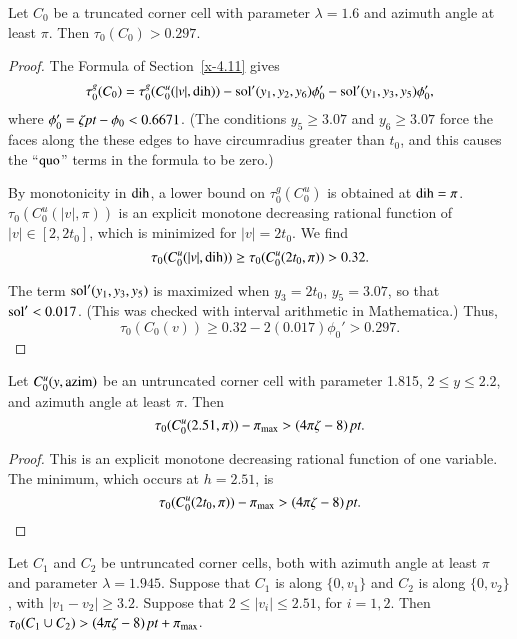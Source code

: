 \begin{lemma}\label{lemma:tcc-est} 
 Let $C_0$ be a truncated corner cell with
parameter $\lambda=1.6$ and azimuth angle at least $\pi$. 
Then $\tau_0(C_0) > 0.297$.
\end{lemma}




\begin{proof}
 The Formula of Section~\ref{x-4.11}
gives
    $$
    \tau_0^g(C_0) =
    \tau^g_0(C^u_0(|v|,\operatorname{dih}))
    - \operatorname{sol}'(y_1,y_2,y_6) \phi'_0
    -\operatorname{sol}'(y_1,y_3,y_5)\phi'_0,
    $$
where $\phi'_0 = \zeta\hbox{\it pt}-\phi_0 < 0.6671$. (The conditions $y_5\ge3.07$
and $y_6\ge 3.07$ force the faces along the these edges to have
circumradius greater than $t_0$, and this causes the ``$\operatorname{quo}$'' terms in
the formula to be zero.)

By monotonicity in $\operatorname{dih}$, a lower bound on $\tau^g_0(C^u_0)$ is
obtained at $\operatorname{dih}=\pi$. $\tau_0(C^u_0(|v|,\pi))$ is an explicit monotone
decreasing rational function of $|v|\in[2,2t_0]$, which is minimized for
$|v|=2t_0$.  We find
    $$\tau_0(C_0^u(|v|,\operatorname{dih}))\ge\tau_0(C_0^u(2t_0,\pi)) >0.32.$$

The term $\operatorname{sol}'(y_1,y_3,y_5)$ is maximized when $y_3=2t_0$, $y_5=3.07$,
so that $\operatorname{sol}'< 0.017$.  (This was checked with interval arithmetic in
Mathematica.) Thus,
    $$\tau_0(C_0(v))\ge 0.32 - 2(0.017) \phi_0' > 0.297.$$
\end{proof}



\begin{lemma}  Let $C^u_0(y,{\operatorname{azim}})$ be an untruncated corner
cell with parameter 1.815, $2\le y\le 2.2$, 
and azimuth angle at least $\pi$.  Then
 $$\tau_0(C^u_0(2.51,\pi))-\pi_{\max} > (4\pi\zeta-8)\,\hbox{\it pt}.$$
\end{lemma}

\begin{proof}
This is an explicit monotone decreasing rational function of one
variable. The minimum, which occurs at $h=2.51$, is
    $$\tau_0(C^u_0(2t_0,\pi))-\pi_{\max} > (4\pi\zeta-8)\,\hbox{\it pt}.$$
\end{proof}

\begin{lemma}\label{lemma:2tcc} 
Let $C_1$ and $C_2$ be untruncated corner cells, both
with azimuth angle at least $\pi$ and parameter $\lambda=1.945$.
Suppose that $C_1$ is along $\{0,v_1\}$ and $C_2$ is along
$\{0,v_2\}$, with $|v_1-v_2|\ge 3.2$.  Suppose that
$2\le |v_i|\le 2.51$, for $i=1,2$.  Then
$\tau_0(C_1\cup C_2) > (4\pi\zeta-8)\,\hbox{\it pt} + \pi_{\max}$.
\end{lemma}

